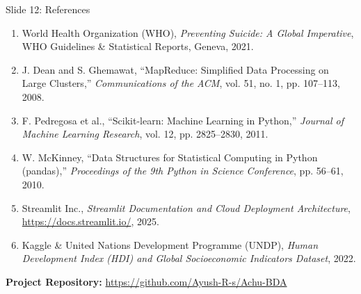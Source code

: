 \documentclass[10pt, aspectratio=169]{beamer}
\begin{document}
\begin{frame}{Slide 12: References}
    \begin{enumerate}
        \item World Health Organization (WHO), \textit{Preventing Suicide: A Global Imperative}, WHO Guidelines \& Statistical Reports, Geneva, 2021.
        \item J. Dean and S. Ghemawat, ``MapReduce: Simplified Data Processing on Large Clusters,'' \textit{Communications of the ACM}, vol. 51, no. 1, pp. 107--113, 2008.
        \item F. Pedregosa et al., ``Scikit-learn: Machine Learning in Python,'' \textit{Journal of Machine Learning Research}, vol. 12, pp. 2825--2830, 2011.
        \item W. McKinney, ``Data Structures for Statistical Computing in Python (pandas),'' \textit{Proceedings of the 9th Python in Science Conference}, pp. 56--61, 2010.
        \item Streamlit Inc., \textit{Streamlit Documentation and Cloud Deployment Architecture}, \url{https://docs.streamlit.io/}, 2025.
        \item Kaggle \& United Nations Development Programme (UNDP), \textit{Human Development Index (HDI) and Global Socioeconomic Indicators Dataset}, 2022.
    \end{enumerate}
    
    \vspace{0.3cm}
    \centering
    \textbf{Project Repository:} \url{https://github.com/Ayush-R-s/Achu-BDA}
\end{frame}
\end{document}
